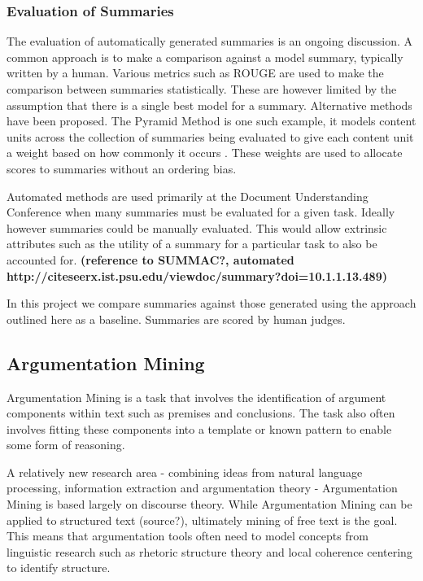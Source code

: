       \subsubsection{Evaluation of Summaries}
        The evaluation of automatically generated summaries is an ongoing discussion. A common approach is to make a comparison against a model summary, typically written by a human. Various metrics such as ROUGE \cite{lin2004rouge} are used to make the comparison between summaries statistically. These are however limited by the assumption that there is a single best model for a summary. Alternative methods have been proposed. The Pyramid Method is one such example, it models content units across the collection of summaries being evaluated to give each content unit a weight based on how commonly it occurs \cite{nenkova2004evaluating}. These weights are used to allocate scores to summaries without an ordering bias.

        Automated methods are used primarily at the Document Understanding Conference when many summaries must be evaluated for a given task. Ideally however summaries could be manually evaluated. This would allow extrinsic attributes such as the utility of a summary for a particular task to also be accounted for. \textbf{(reference to SUMMAC?, automated http://citeseerx.ist.psu.edu/viewdoc/summary?doi=10.1.1.13.489)}

        In this project we compare summaries against those generated using the approach outlined here \cite{nenkova2006compositional} as a baseline. Summaries are scored by human judges.

    \subsection{Argumentation Mining}
      Argumentation Mining is a task that involves the identification of argument components within text such as premises and conclusions. The task also often involves fitting these components into a template or known pattern to enable some form of reasoning. \cite{palau2009argumentation}

      A relatively new research area - combining ideas from natural language processing, information extraction and argumentation theory - Argumentation Mining is based largely on discourse theory. While Argumentation Mining can be applied to structured text (source?), ultimately mining of free text is the goal. This means that argumentation tools often need to model concepts from linguistic research such as rhetoric structure theory \cite{mann1988rhetorical} and local coherence centering \cite{weinstein21centering} to identify structure.

